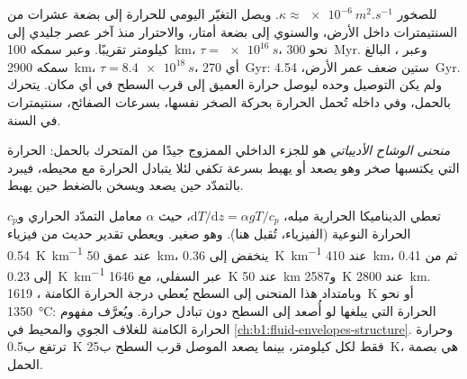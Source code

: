 للصخور $\kappa \approx \qty{e-6}{m^2.s^{-1}}$. ويصل التغيّر اليومي للحرارة إلى بضعة عشرات من السنتيمترات داخل الأرض، والسنوي إلى بضعة أمتار، والاحترار منذ آخر عصر جليدي إلى كيلومتر تقريبًا. وعبر  سمكه \qty{100}{km}، $\tau = \qty{e16}{s}$، نحو \qty{300}{Myr}. وعبر ، البالغ سمكه \qty{2900}{km}، $\tau = \qty{8.4e18}{s}$، أي \qty{270}{Gyr}: ستين ضعف عمر الأرض، \qty{4.54}{Gyr}. %
ولم يكن التوصيل وحده ليوصل حرارة  العميق إلى قرب السطح في أي مكان.  يتحرك بالحمل، وفي داخله تُحمل الحرارة بحركة الصخر نفسها، بسرعات الصفائح، سنتيمترات في السنة. %

\begin{definition}\label{def:b1:heat-budget:adiabat}
\emph{منحنى الوشاح الأديباتي} هو  للجزء الداخلي الممزوج جيدًا من  المتحرك بالحمل: الحرارة التي يكتسبها صخر  وهو يصعد أو يهبط بسرعة تكفي لئلا يتبادل الحرارة مع محيطه، فيبرد بالتمدّد حين يصعد ويسخن بالضغط حين يهبط.
\end{definition}

تعطي الديناميكا الحرارية ميله، $\mathrm dT/\mathrm dz = \alpha g T/c_p$، حيث $\alpha$ معامل التمدّد الحراري و$c_p$ الحرارة النوعية (الفيزياء، تُقبل هنا). وهو صغير. ويعطي تقدير حديث من فيزياء  \qty{0.54}{K.km^{-1}} عند عمق \qty{50}{km}، ينخفض إلى \qty{0.36}{K.km^{-1}} عند \qty{410}{km}، ثم من 0.41 إلى \qty{0.23}{K.km^{-1}} عبر  السفلي، مع \qty{1646}{K} عند \qty{50}{km} و\qty{2587}{K} عند \qty{2800}{km}.
وبامتداد هذا المنحنى إلى السطح يُعطي درجة الحرارة الكامنة ، \qty{1619}{K} أو نحو \qty{1350}{\degreeCelsius}: الحرارة التي يبلغها  لو أُصعد إلى السطح دون تبادل حرارة. ويُعرَّف مفهوم الحرارة الكامنة للغلاف الجوي والمحيط في \cref{ch:b1:fluid-envelopes-structure}. وحرارة ترتفع ب\qty{0.5}{K} فقط لكل كيلومتر، بينما يصعد  الموصل قرب السطح ب\qty{25}{K}، هي بصمة الحمل.

